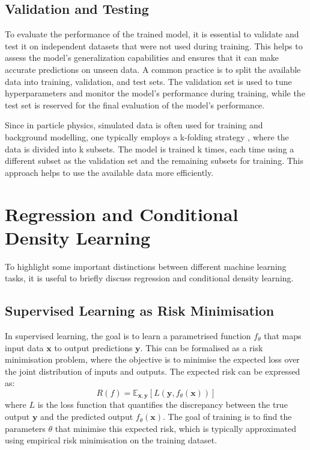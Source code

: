 \subsection{Validation and Testing}
To evaluate the performance of the trained model, it is essential to validate and test it on independent datasets that were not used during training. This helps to assess the model's generalization capabilities and ensures that it can make accurate predictions on unseen data. A common practice is to split the available data into training, validation, and test sets. The validation set is used to tune hyperparameters and monitor the model's performance during training, while the test set is reserved for the final evaluation of the model's performance.

Since in particle physics, simulated data is often used for training and background modelling, one typically employs a k-folding strategy \cite{k-folding}, where the data is divided into k subsets. The model is trained k times, each time using a different subset as the validation set and the remaining subsets for training. This approach helps to use the available data more efficiently.

\section{Regression and Conditional Density Learning}
To highlight some important distinctions between different machine learning tasks, it is useful to briefly discuss regression and conditional density learning.
\subsection{Supervised Learning as Risk Minimisation}
In supervised learning, the goal is to learn a parametrised function $f_\theta$ that maps input data $\mathbf{x}$ to output predictions $\mathbf{y}$. This can be formalised as a risk minimisation problem, where the objective is to minimise the expected loss over the joint distribution of inputs and outputs. The expected risk can be expressed as:
\begin{equation}
    R(f) = \mathbb{E}_{\mathbf{x}, \mathbf{y}}[L(\mathbf{y}, f_\theta(\mathbf{x}))]
\end{equation}
where $L$ is the loss function that quantifies the discrepancy between the true output $\mathbf{y}$ and the predicted output $f_\theta(\mathbf{x})$. The goal of training is to find the parameters $\theta$ that minimise this expected risk, which is typically approximated using empirical risk minimisation on the training dataset.
